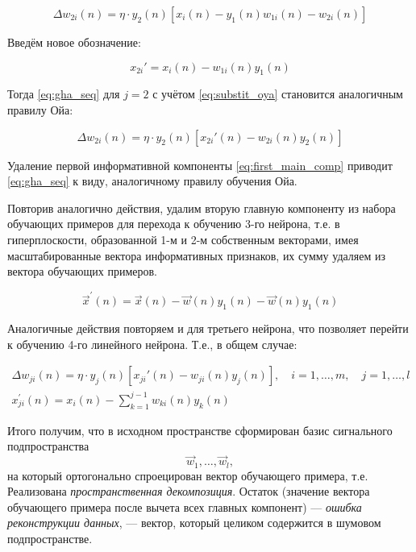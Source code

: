 \documentclass{article}
\numberwithin{equation}{subsection}
\begin{document}
\begin{equation}
    \Delta w_{2i}(n) = \eta \cdot y_2(n) \left[
        x_i(n) - y_1(n) w_{1i}(n) - w_{2i}(n)
    \right]
\end{equation}

Введём новое обозначение:

\begin{equation}
    x_{2i}' = x_i(n) - w_{1i}(n) y_1(n)
    \label{eq:substit_oya}
\end{equation}

Тогда \ref{eq:gha_seq} для $j=2$ с учётом \ref{eq:substit_oya} становится аналогичным правилу Ойа:

\begin{equation}
    \Delta w_{2i}(n) = \eta \cdot y_2(n) 
    \left[
        x_{2i}'(n) - w_{2i}(n) y_2(n)
    \right]
\end{equation}

Удаление первой информативной компоненты \ref{eq:first_main_comp} приводит \ref{eq:gha_seq} 
к виду, аналогичному правилу обучения Ойа.

Повторив аналогично действия, удалим вторую главную компоненту из набора обучающих примеров 
для перехода к обучению 3-го нейрона, т.е. в гиперплоскости, образованной 1-м и 2-м собственным 
векторами, имея масштабированные вектора информативных признаков, их сумму удаляем из вектора 
обучающих примеров.

\begin{equation}
    \vec{x}^\prime(n) = \vec{x}(n) - \vec{w}(n) y_1(n) - \vec{w}(n) y_1(n) 
\end{equation}

Аналогичные действия повторяем и для третьего нейрона, что позволяет перейти к обучению 4-го
линейного нейрона. Т.е., в общем случае:

\begin{align}
    \Delta w_{ji}(n) = \eta \cdot y_j(n) 
    \left[
        x_{ji}'(n) - w_{ji}(n) y_j(n)
    \right], \quad i = 1, \dots, m,\quad j=1, \dots, l \\
    x_{ji}^\prime (n) = x_i(n) - \sum_{k=1}^{j-1} w_{ki} (n) y_k (n)
\end{align}

Итого получим, что в исходном пространстве сформирован базис сигнального подпространства
\begin{equation*}
    \vec{w}_1, \dots, \vec{w}_l,
\end{equation*}
\noindent
на который ортогонально спроецирован вектор обучающего примера, т.е. Реализована 
\textit{пространственная декомпозиция}.
Остаток (значение вектора обучающего примера после вычета всех главных компонент)
--- \textit{ошибка реконструкции данных}, --- вектор, который целиком содержится 
в шумовом подпространстве.
\end{document}
